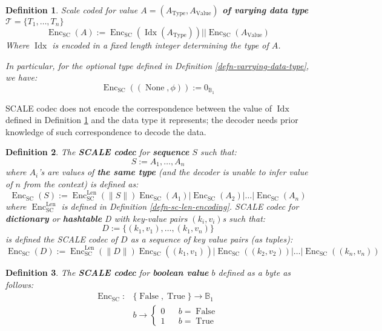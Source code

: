 \documentclass{book}
\newcommand{\assign}{:=}
\newcommand{\tmop}[1]{\ensuremath{\operatorname{#1}}}
\newcommand{\tmstrong}[1]{\textbf{#1}}
\newcommand{\tmtextbf}[1]{{\bfseries{#1}}}
\newtheorem{definition}{Definition}
\providecommand{\tmop}[1]{\ensuremath{\mathrm{#1}}}
\providecommand{\tmstrong}[1]{\tmtextbf{#1}}
\providecommand{\tmtextbf}[1]{\tmtextbf{#1}}
\newtheorem{definition}{Definition}
\begin{document}
\begin{definition}
  \label{defn-scale-variable-type}Scale coded for value {\tmstrong{$A =
  (A_{\tmop{Type}}, A_{\tmop{Value}})$ of varying data type}} $\mathcal{T}= \{
  T_1, \ldots, T_n \}$
  \[ \tmop{Enc}_{\tmop{SC}} (A) \assign \tmop{Enc}_{\tmop{SC}} (\tmop{Idx}
     (A_{\tmop{Type}})) | | \tmop{Enc}_{\tmop{SC}} (A_{\tmop{Value}}) \]
  Where $\tmop{Idx}$ is encoded in a fixed length integer determining the type
  of $A$.
  
  In particular, for the optional type defined in Definition
  \ref{defn-varrying-data-type}, we have:
  \[ \tmop{Enc}_{\tmop{SC}} ((\tmop{None}, \phi)) \assign 0_{\mathbb{B}_1} \]
\end{definition}

SCALE codec does not encode the correspondence between the value of
$\tmop{Idx}$ defined in Definition \ref{defn-scale-variable-type} and the data
type it represents; the decoder needs prior knowledge of such correspondence
to decode the data.

\begin{definition}
  \label{defn-scale-list}The {\tmstrong{SCALE codec}} for
  {\tmstrong{sequence}} $S$ such that:
  \[ S \assign A_1, \ldots, A_n \]
  where $A_i$'s are values of {\tmstrong{the same type}} (and the decoder is
  unable to infer value of $n$ from the context) is defined as:
  \[ \tmop{Enc}_{\tmop{SC}} (S) \assign \tmop{Enc}^{\tmop{Len}}_{\tmop{SC}}
     (\| S \|) \tmop{Enc}_{\tmop{SC}} (A_1) | \tmop{Enc}_{\tmop{SC}} (A_2) |
     \ldots | \tmop{Enc}_{\tmop{SC}} (A_n) \]
  where $\tmop{Enc}_{\tmop{SC}}^{\tmop{Len}}$ is defined in Definition
  \ref{defn-sc-len-encoding}. SCALE codec for {\tmstrong{dictionary}} or
  {\tmstrong{hashtable}} D with key-value pairs $(k_i, v_i)$s such that:
  \[ D \assign \{ (k_1, v_1), \ldots, (k_1, v_n) \} \]
  is defined the SCALE codec of $D$ as a sequence of key value pairs (as
  tuples):
  \[ \tmop{Enc}_{\tmop{SC}} (D) \assign \tmop{Enc}^{\tmop{Len}}_{\tmop{SC}}
     (\| D \|) \tmop{Enc}_{\tmop{SC}} ((k_1, v_1)_{}) | \tmop{Enc}_{\tmop{SC}}
     ((k_2, v_2)) | \ldots | \tmop{Enc}_{\tmop{SC}} ((k_n, v_n)) \]
  \[ \  \]
\end{definition}

\begin{definition}
  The {\tmstrong{SCALE codec}} for {\tmstrong{boolean value}} $b$ defined as a
  byte as follows:
  \[ \begin{array}{ll}
       \tmop{Enc}_{\tmop{SC}} : & \{ \tmop{False}, \tmop{True} \} \rightarrow
       \mathbb{B}_1\\
       & b \rightarrow \left\{ \begin{array}{lcl}
         0 &  & b = \tmop{False}\\
         1 &  & b = \tmop{True}
       \end{array} \right.
     \end{array} \]
\end{definition}
\end{document}
